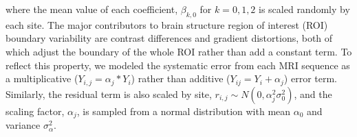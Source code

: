 where the mean value of each coefficient,
$\beta_{k,0}$ for  $k=0,1,2$ is scaled randomly by each site. The major contributors to brain structure region of interest (ROI) boundary variability are contrast differences and gradient distortions, both of which adjust the boundary of the whole ROI rather than add a constant term. To reflect this property, we modeled the systematic error from each MRI sequence as a multiplicative ($Y_{i,j} = \alpha_j*Y_i$) rather than additive ($Y_{ij} = Y_i + \alpha_j$) error term. Similarly, the residual term is also scaled by site, $r_{i,j} \sim N(0,\alpha_j^2\sigma_0^2)$, and the scaling factor, $\alpha_j$, is sampled from a normal distribution with mean $\alpha_0$ and variance $\sigma_{\alpha}^2$.